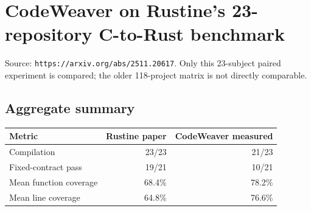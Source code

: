 \documentclass{article}
\begin{document}
\section*{CodeWeaver on Rustine's 23-repository C-to-Rust benchmark}
Source: \texttt{https://arxiv.org/abs/2511.20617}. Only this 23-subject paired experiment is compared; the older 118-project matrix is not directly comparable.
\begin{abstract}
We evaluate CodeWeaver with GPT-5.6 Sol on the same 23 C-to-Rust subjects used by Rustine. To prevent target leakage, CodeWeaver receives only disclosed C inputs, Rust skeletons, and immutable test contracts; Rustine production translations remain excluded. Independent evaluation finds 21/23 compiling CodeWeaver translations and 10/21 fixed-contract passes. Rustine's published reference reports 23/23 compilation and 19/21 complete test-suite passes. Exact measured, inferred, unavailable, and not-applicable states remain distinct throughout the artifact.
\end{abstract}
\subsection*{Aggregate summary}
\begin{tabular}{lrr}
\toprule Metric & Rustine paper & CodeWeaver measured\\\midrule
Compilation & 23/23 & 21/23\\
Fixed-contract pass & 19/21 & 10/21\\
Mean function coverage & 68.4\% & 78.2\%\\
Mean line coverage & 64.8\% & 76.6\%\\
\bottomrule
\end{tabular}
\end{document}
